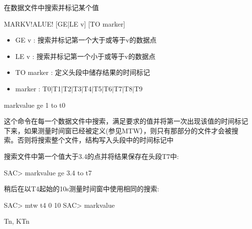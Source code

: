 \label{cmd:markvalue}

在数据文件中搜索并标记某个值

\begin{SACSTX}
MARKV!ALUE! [GE|LE v] [TO marker]
\end{SACSTX}

\begin{itemize}
\item GE v : 搜索并标记第一个大于或等于v的数据点 
\item LE v : 搜索并标记第一个小于或等于v的数据点 
\item TO marker : 定义头段中储存结果的时间标记 
\item marker : T0|T1|T2|T3|T4|T5|T6|T7|T8|T9 
\end{itemize}

\begin{SACDFT}
markvalue ge 1 to t0
\end{SACDFT}

这个命令在每一个数据文件中搜索，满足要求的值并将第一次出现该值的时间标记下来，如果测量时间窗已经被定义(参见MTW），则只有那部分的文件才会被搜索。否则将搜索整个文件，结构写入头段中的时间标记中

搜索文件中第一个值大于3.4的点并将结果保存在头段T7中:
\begin{SACCode}
SAC> markvalue ge 3.4 to t7
\end{SACCode}

稍后在以T4起始的10s测量时间窗中使用相同的搜索:
\begin{SACCode}
SAC> mtw t4 0 10
SAC> markvalue
\end{SACCode}

Tn, KTn

